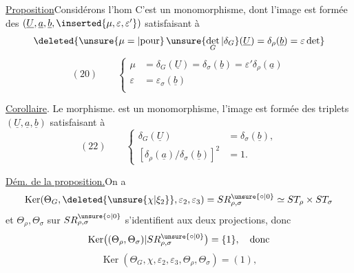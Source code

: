 \uline{Proposition}\quad Considérons l'hom
C'est un monomorphisme, dont l'image est
formée des 
$(\underline U,\underline a,\underline b,\inserted{\mu,\varepsilon,\varepsilon'})$
satisfaisant à
\[
\deleted{\unsure{\mu=|\text{pour}}\,
\unsure{\det_G|\delta_G}(\underline U)
=\delta_\rho(\underline b)=\varepsilon\det}
\]
\[
(20)\qquad\left\{\begin{aligned}
\mu&=\delta_G(\underline U)=\delta_\sigma(\underline b)
=\varepsilon'\delta_\rho(\underline a)\\
\varepsilon&=\varepsilon_\sigma(\underline b)\\[1ex]
\end{aligned}\right.
\]

\uline{Corollaire}. Le morphisme.
est un monomorphisme, l'image est formée des triplets
$(\underline U,\underline a,\underline b)$ satisfaisant à
\[
(22)\qquad\left\{\begin{aligned}
\delta_G(\underline U)&=\delta_\sigma(\underline b),\\
[\delta_\rho(\underline a)/\delta_\sigma(\underline b)]^2&=1.
\end{aligned}\right.
\]

\uline{Dém. de la proposition.}\quad On a
\[
\operatorname{Ker}(\Theta_G,\deleted{\unsure{\chi|\xi_2}},\varepsilon_2,\varepsilon_3)
=SR_{\rho,\sigma}^{\unsure{\circ|0}}\simeq ST_\rho\times ST_\sigma
\]
et $\Theta_\rho,\Theta_\sigma$ 
sur $SR_{\rho,\sigma}^{\unsure{\circ|0}}$ s'identifient aux deux projections,
donc \deleted{$\unsure{\Theta}$}
\[
\operatorname{Ker}\bigl((\Theta_\rho,\Theta_\sigma)|SR_{\rho,\sigma}^{\unsure{\circ|0}}\bigr)
=\{1\},\quad\text{donc}
\]
\[
\operatorname{Ker}(\Theta_G,\chi,\varepsilon_2,\varepsilon_3,\Theta_\rho,\Theta_\sigma)
=(1),
\]

